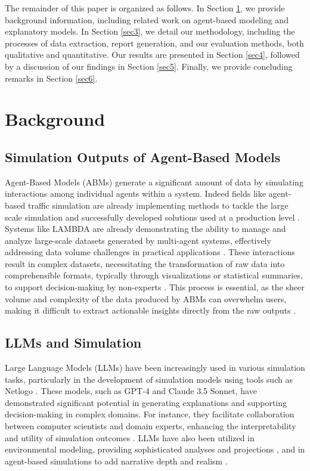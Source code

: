 \documentclass[preprint,12pt]{elsarticle}
\begin{document}
The remainder of this paper is organized as follows. In Section \ref{sec2}, we provide background information, including related work on agent-based modeling and explanatory models. In Section \ref{sec3}, we detail our methodology, including the processes of data extraction, report generation, and our evaluation methods, both qualitative and quantitative. Our results are presented in Section \ref{sec4}, followed by a discussion of our findings in Section \ref{sec5}. Finally, we provide concluding remarks in Section \ref{sec6}.

\section{Background}
\label{sec2}

\subsection{Simulation Outputs of Agent-Based Models}


Agent-Based Models (ABMs) generate a significant amount of data by simulating interactions among individual agents within a system. Indeed fields like agent-based traffic simulation are already implementing methods to tackle the large scale simulation and successfully developed solutions used at a production level \cite{Graur2021}. Systems like LAMBDA are already demonstrating the ability to manage and analyze large-scale datasets generated by multi-agent systems, effectively addressing data volume challenges in practical applications \cite{Sun2024}. These interactions result in complex datasets, necessitating the transformation of raw data into comprehensible formats, typically through visualizations or statistical summaries, to support decision-making by non-experts \cite{Lee2015}. This process is essential, as the sheer volume and complexity of the data produced by ABMs can overwhelm users, making it difficult to extract actionable insights directly from the raw outputs \cite{Sun2016}.\\

\subsection{LLMs and Simulation}

Large Language Models (LLMs) have been increasingly used in various simulation tasks, particularly in the development of simulation models using tools such as Netlogo \cite{Frydenlund2024}. These models, such as GPT-4 and Claude 3.5 Sonnet, have demonstrated significant potential in generating explanations and supporting decision-making in complex domains. For instance, they facilitate collaboration between computer scientists and domain experts, enhancing the interpretability and utility of simulation outcomes \cite{Gurcan2024}. LLMs have also been utilized in environmental modeling, providing sophisticated analyses and projections \cite{Kim2024}, and in agent-based simulations to add narrative depth and realism \cite{Aoki2023}.
\end{document}
